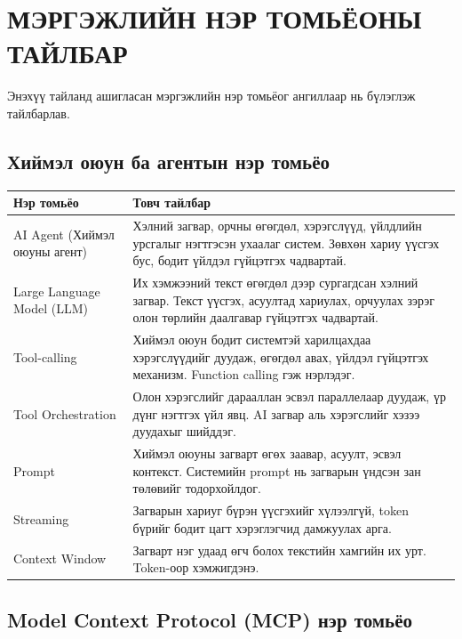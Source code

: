 \chapter*{МЭРГЭЖЛИЙН НЭР ТОМЬЁОНЫ ТАЙЛБАР}

Энэхүү тайланд ашигласан мэргэжлийн нэр томьёог ангиллаар нь бүлэглэж тайлбарлав.

\section*{Хиймэл оюун ба агентын нэр томьёо}

\begin{table}[H]
  \centering
  \begin{tabularx}{\textwidth}{>{\raggedright\arraybackslash}p{4.5cm} X}
    \toprule
    Нэр томьёо & Товч тайлбар \\
    \midrule
    AI Agent (Хиймэл оюуны агент) & Хэлний загвар, орчны өгөгдөл, хэрэгслүүд, үйлдлийн урсгалыг нэгтгэсэн ухаалаг систем. Зөвхөн хариу үүсгэх бус, бодит үйлдэл гүйцэтгэх чадвартай. \\
    \addlinespace
    Large Language Model (LLM) & Их хэмжээний текст өгөгдөл дээр сургагдсан хэлний загвар. Текст үүсгэх, асуултад хариулах, орчуулах зэрэг олон төрлийн даалгавар гүйцэтгэх чадвартай. \\
    \addlinespace
    Tool-calling & Хиймэл оюун бодит системтэй харилцахдаа хэрэгслүүдийг дуудаж, өгөгдөл авах, үйлдэл гүйцэтгэх механизм. Function calling гэж нэрлэдэг. \\
    \addlinespace
    Tool Orchestration & Олон хэрэгслийг дарааллан эсвэл параллелаар дуудаж, үр дүнг нэгтгэх үйл явц. AI загвар аль хэрэгслийг хэзээ дуудахыг шийддэг. \\
    \addlinespace
    Prompt & Хиймэл оюуны загварт өгөх заавар, асуулт, эсвэл контекст. Системийн prompt нь загварын үндсэн зан төлөвийг тодорхойлдог. \\
    \addlinespace
    Streaming & Загварын хариуг бүрэн үүсгэхийг хүлээлгүй, token бүрийг бодит цагт хэрэглэгчид дамжуулах арга. \\
    \addlinespace
    Context Window & Загварт нэг удаад өгч болох текстийн хамгийн их урт. Token-оор хэмжигдэнэ. \\
    \bottomrule
  \end{tabularx}
\end{table}

\section*{Model Context Protocol (MCP) нэр томьёо}


